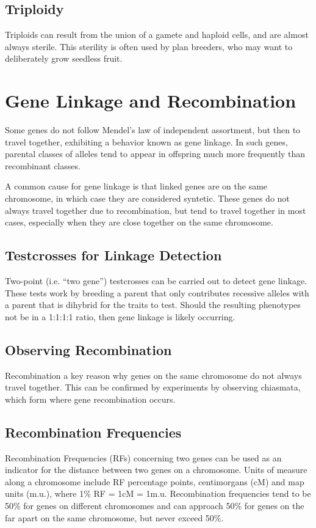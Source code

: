 \documentclass[12pt,titlepage]{article}
\begin{document}
      \subsection{Triploidy}
        Triploids can result from the union of a gamete and haploid cells, and are almost always sterile. This sterility is often used by plan breeders,
        who may want to deliberately grow seedless fruit.

    \section{Gene Linkage and Recombination}
      Some genes do not follow Mendel's law of independent assortment, but then to travel together, exhibiting a behavior known as gene linkage. In such
      genes, parental classes of alleles tend to appear in offspring much more frequently than recombinant classes.

      A common cause for gene linkage is that linked genes are on the same chromosome, in which case they are considered syntetic. These genes do not always
      travel together due to recombination, but tend to travel together in most cases, especially when they are close together on the same chromosome.

      \subsection{Testcrosses for Linkage Detection}
        Two-point (i.e. ``two gene'') testcrosses can be carried out to detect gene linkage. These tests work by breeding a parent that only contributes
        recessive alleles with a parent that is dihybrid for the traits to test. Should the resulting phenotypes not be in a 1:1:1:1 ratio, then gene linkage
        is likely occurring.

      \subsection{Observing Recombination}
        Recombination a key reason why genes on the same chromosome do not always travel together. This can be confirmed by experiments by observing
        chiasmata, which form where gene recombination occurs.

      \subsection{Recombination Frequencies}
        Recombination Frequencies (RFs) concerning two genes can be used as an indicator for the distance between two genes on a chromosome. Units of measure
        along a chromosome include RF percentage points, centimorgans (cM) and map units (m.u.), where 1\% RF = 1cM = 1m.u. Recombination frequencies tend to
        be 50\% for genes on different chromosomes and can approach 50\% for genes on the far apart on the same chromosome, but never exceed 50\%.
\end{document}
